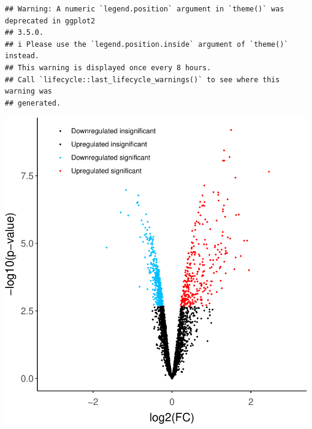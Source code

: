 \documentclass[9pt,a4paper,]{extarticle}
\begin{document}
\begin{verbatim}
## Warning: A numeric `legend.position` argument in `theme()` was deprecated in ggplot2
## 3.5.0.
## i Please use the `legend.position.inside` argument of `theme()` instead.
## This warning is displayed once every 8 hours.
## Call `lifecycle::last_lifecycle_warnings()` to see where this warning was
## generated.
\end{verbatim}

\begin{center}\includegraphics[height=0.4\textheight]{workflow_expressions_files/figure-latex/volcano_plot-1} \end{center}
\end{document}
